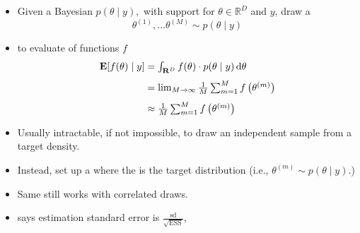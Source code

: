 \documentclass[10pt]{report}
\newcommand{\expect}[1]{\mathbb{E}\!\left[ #1 \right]}
\newcommand{\draw}[2]{#1^{(#2)}}
\begin{document}
\begin{itemize}
\item Given a Bayesian  $p(\theta \mid y),$
  with support for  $\theta \in \mathbb{R}^D$ and  $y$,
  draw a 
  $$ \textstyle
  \draw{\theta}{1}, \ldots \draw{\theta}{M} \sim p(\theta \mid y)
  $$
\item to evaluate  of functions $f$
\begin{align*}
  \textstyle 
  \expect{f(\theta) \mid y}
  &= \textstyle \int_{\mathbb{R}^D} f(\theta) \cdot p(\theta \mid y) \,
    \textrm{d}\theta
  \\[4pt]
  &= \textstyle \lim_{M \rightarrow \infty} \frac{1}{M} \sum_{m=1}^M 
f\left( \draw{\theta}{m} \right)
  \\[4pt] \textstyle
  &\approx \textstyle \frac{1}{M} \sum_{m=1}^M f\left(\draw{\theta}{m}\right) 
\end{align*}
\end{itemize}

\begin{itemize}
\item Usually intractable, if not impossible, to draw an independent sample from a target density.
\item Instead, set up a  where the 
  is the target distribution (i.e., $\theta^{(m)} \sim p(\theta \mid y).$)
\item Same  still works with correlated draws.
\item {} says estimation standard error is
  $\frac{\textrm{sd}}{\sqrt{\textrm{ESS}}}$,
\end{itemize}
\end{document}
